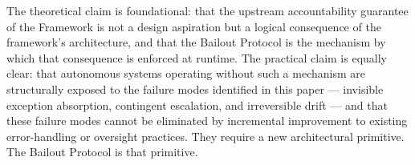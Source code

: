 The theoretical claim is foundational: that the upstream accountability guarantee of the \bxthree{} Framework is not a design aspiration but a logical consequence of the framework's architecture, and that the Bailout Protocol is the mechanism by which that consequence is enforced at runtime. The practical claim is equally clear: that autonomous systems operating without such a mechanism are structurally exposed to the failure modes identified in this paper --- invisible exception absorption, contingent escalation, and irreversible drift --- and that these failure modes cannot be eliminated by incremental improvement to existing error-handling or oversight practices. They require a new architectural primitive. The Bailout Protocol is that primitive.